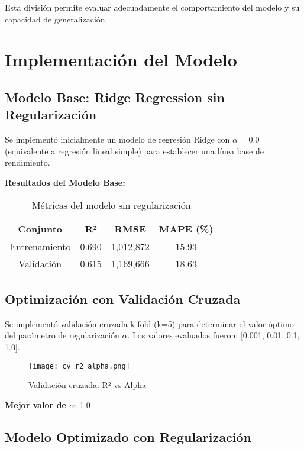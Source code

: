 \documentclass[11pt,a4paper]{article}
\begin{document}
Esta división permite evaluar adecuadamente el comportamiento del modelo y su capacidad de generalización.

\section{Implementación del Modelo}

\subsection{Modelo Base: Ridge Regression sin Regularización}

Se implementó inicialmente un modelo de regresión Ridge con $\alpha = 0.0$ (equivalente a regresión lineal simple) para establecer una línea base de rendimiento.

\textbf{Resultados del Modelo Base:}
\begin{table}[H]
    \centering
    \begin{tabular}{|c|c|c|c|}
    \hline
    \textbf{Conjunto} & \textbf{R²} & \textbf{RMSE} & \textbf{MAPE (\%)} \\
    \hline
    Entrenamiento & 0.690 & 1,012,872 & 15.93 \\
    Validación & 0.615 & 1,169,666 & 18.63 \\
    \hline
    \end{tabular}
    \caption{Métricas del modelo sin regularización}
    \label{tab:base_model}
\end{table}

\subsection{Optimización con Validación Cruzada}

Se implementó validación cruzada k-fold (k=5) para determinar el valor óptimo del parámetro de regularización $\alpha$. Los valores evaluados fueron: [0.001, 0.01, 0.1, 1.0].

\begin{figure}[H]
    \centering
    \texttt{[image: cv\_r2\_alpha.png]}
    \caption{Validación cruzada: R² vs Alpha}
    \label{fig:cv_alpha}
\end{figure}

\textbf{Mejor valor de $\alpha$}: 1.0

\subsection{Modelo Optimizado con Regularización}
\end{document}
